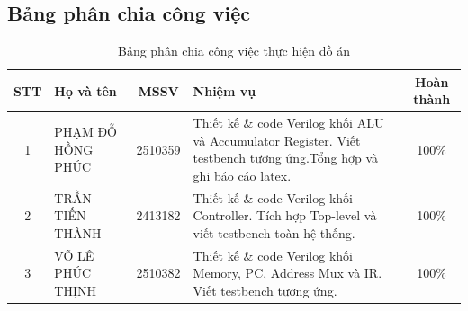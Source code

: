 \subsection{Bảng phân chia công việc}
\begin{table}[H]
\centering
\caption{Bảng phân chia công việc thực hiện đồ án}
\renewcommand{\arraystretch}{1.5}
\begin{tabularx}{\textwidth}{|c|>{\raggedright\arraybackslash}X|c|>{\raggedright\arraybackslash}p{6cm}|c|}
\hline
\textbf{STT} & \textbf{Họ và tên} & \textbf{MSSV} & \textbf{Nhiệm vụ} & \textbf{Hoàn thành} \\ \hline
1 & PHẠM ĐỖ HỒNG PHÚC & 2510359 & Thiết kế \& code Verilog khối ALU và Accumulator Register. Viết testbench tương ứng.Tổng hợp và ghi báo cáo latex. & 100\% \\ \hline
2 & TRẦN TIẾN THÀNH & 2413182 &  Thiết kế \& code Verilog khối Controller. Tích hợp Top-level và viết testbench toàn hệ thống. & 100\% \\ \hline
3 & VÕ LÊ PHÚC THỊNH & 2510382 & Thiết kế \& code Verilog khối Memory, PC, Address Mux và IR. Viết testbench tương ứng. & 100\% \\ \hline
\end{tabularx}
\end{table}